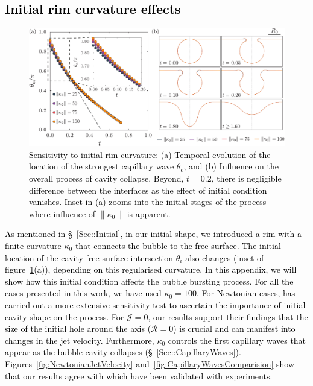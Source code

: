 \documentclass[final]{jfm}
\newcommand*\red{\textcolor{black}}
\begin{document}
\subsection{\red{Initial rim curvature effects}}\label{App::FilletCurvature}
\begin{figure}
	\centerline{\includegraphics[width=\linewidth]{Figures/FigureE3_Kappa0-eps-converted-to.pdf}}%
	\caption{\red{Sensitivity to initial rim curvature: (a) Temporal evolution of the location of the strongest capillary wave $\theta_c$, and (b) Influence on the overall process of cavity collapse. Beyond, $t = 0.2$, there is negligible difference between the interfaces as the effect of initial condition vanishes. Inset in (a) zooms into the initial stages of the process where influence of $\|\kappa_0\|$ is apparent.}}
	\label{fig:kappa0}
\end{figure}
\red{As mentioned in \S~\ref{Sec::Initial}, in our initial shape, we introduced a rim with a finite curvature $\kappa_0$ that connects the bubble to the free surface. The initial location of the cavity-free surface intersection $\theta_i$ also changes (inset of figure~\ref{fig:kappa0}(a)), depending on this regularised curvature. In this appendix, we will show how this initial condition affects the bubble bursting process. For all the cases presented in this work, we have used $\kappa_0 = 100$. For Newtonian cases, \citet{deike2018dynamics} has carried out a more extensive sensitivity test to ascertain the importance of initial cavity shape on the process. For $\mathcal{J} = 0$, our results support their findings that the size of the initial hole around the axis ($\mathcal{R} = 0$) is crucial and can manifest into changes in the jet velocity. Furthermore, $\kappa_0$ controls the first capillary waves that appear as the bubble cavity collapses (\S~\ref{Sec::CapillaryWaves}). Figures~\ref{fig:NewtonianJetVelocity} and~\ref{fig:CapillaryWavesComparision} show that our results agree with \cite{deike2018dynamics, gordillo2019capillary} which have been validated with experiments.}
\end{document}
